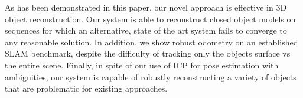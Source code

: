 As has been demonstrated in this paper, our novel approach is effective in 3D object 
reconstruction. Our system is able to reconstruct closed object models on sequences for which an alternative, state of 
the art system \cite{Ren2013} fails to converge to any reasonable solution. In addition, we show robust odometry on an 
established SLAM benchmark, despite the difficulty of tracking only the objects surface vs the entire scene. Finally,
in spite of our use of ICP for pose estimation with ambiguities, our system is capable of robustly reconstructing a 
variety of objects that are problematic for existing approaches.